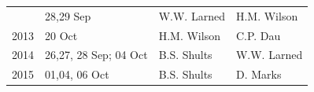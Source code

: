 \documentclass[]{article}
\begin{document}
\begin{longtable}[]{@{}llll@{}}
\begin{minipage}[t]{0.12\columnwidth}
\end{minipage} & \begin{minipage}[t]{0.38\columnwidth}\raggedright\strut
28,29 Sep\strut
\end{minipage} & \begin{minipage}[t]{0.18\columnwidth}\raggedright\strut
W.W. Larned\strut
\end{minipage} & \begin{minipage}[t]{0.20\columnwidth}\raggedright\strut
H.M. Wilson\strut
\end{minipage}\tabularnewline
\begin{minipage}[t]{0.12\columnwidth}\raggedright\strut
2013\strut
\end{minipage} & \begin{minipage}[t]{0.38\columnwidth}\raggedright\strut
20 Oct\strut
\end{minipage} & \begin{minipage}[t]{0.18\columnwidth}\raggedright\strut
H.M. Wilson\strut
\end{minipage} & \begin{minipage}[t]{0.20\columnwidth}\raggedright\strut
C.P. Dau\strut
\end{minipage}\tabularnewline
\begin{minipage}[t]{0.12\columnwidth}\raggedright\strut
2014\strut
\end{minipage} & \begin{minipage}[t]{0.38\columnwidth}\raggedright\strut
26,27, 28 Sep; 04 Oct\strut
\end{minipage} & \begin{minipage}[t]{0.18\columnwidth}\raggedright\strut
B.S. Shults\strut
\end{minipage} & \begin{minipage}[t]{0.20\columnwidth}\raggedright\strut
W.W. Larned\strut
\end{minipage}\tabularnewline
\begin{minipage}[t]{0.12\columnwidth}\raggedright\strut
2015\strut
\end{minipage} & \begin{minipage}[t]{0.38\columnwidth}\raggedright\strut
01,04, 06 Oct\strut
\end{minipage} & \begin{minipage}[t]{0.18\columnwidth}\raggedright\strut
B.S. Shults\strut
\end{minipage} & \begin{minipage}[t]{0.20\columnwidth}\raggedright\strut
D. Marks\strut
\end{minipage}\tabularnewline
\bottomrule
\end{longtable}
\end{document}
